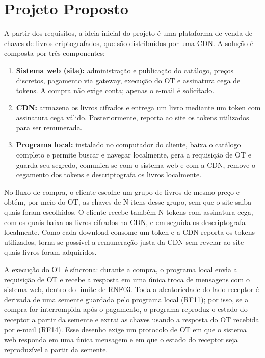 \documentclass[12pt, oneside, a4paper, english, brazil]{abntex2}
\begin{document}
\section{Projeto Proposto}

A partir dos requisitos, a ideia inicial do projeto é uma plataforma de venda
de chaves de livros criptografados, que são distribuídos por uma CDN. A
solução é composta por três componentes:

\begin{enumerate}
\item \textbf{Sistema web (site):} administração e publicação do catálogo,
preços discretos, pagamento via gateway, execução do OT e assinatura cega de
tokens. A compra não exige conta; apenas o e-mail é solicitado.

\item \textbf{CDN:} armazena os livros cifrados e entrega um livro mediante um
token com assinatura cega válido. Posteriormente, reporta ao site os tokens
utilizados para ser remunerada.

\item \textbf{Programa local:} instalado no computador do cliente, baixa o
catálogo completo e permite buscar e navegar localmente, gera a requisição de
OT e guarda seu segredo, comunica-se com o sistema web e com a CDN, remove o
cegamento dos tokens e descriptografa os livros localmente.
\end{enumerate}

No fluxo de compra, o cliente escolhe um grupo de livros de mesmo preço e
obtém, por meio do OT, as chaves de N itens desse grupo, sem que o site saiba
quais foram escolhidos. O cliente recebe também N tokens com assinatura cega,
com os quais baixa os livros cifrados na CDN, e em seguida os descriptografa
localmente. Como cada download consome um token e a CDN reporta os tokens
utilizados, torna-se possível a remuneração justa da CDN sem revelar ao site
quais livros foram adquiridos.

A execução do OT é síncrona: durante a compra, o programa local envia a
requisição de OT e recebe a resposta em uma única troca de mensagens com o
sistema web, dentro do limite de RNF03. Toda a aleatoriedade do lado receptor
é derivada de uma semente guardada pelo programa local (RF11); por isso, se a
compra for interrompida após o pagamento, o programa reproduz o estado do
receptor a partir da semente e extrai as chaves usando a resposta do OT
recebida por e-mail (RF14). Esse desenho exige um protocolo de OT em que o
sistema web responda em uma única mensagem e em que o estado do receptor seja
reproduzível a partir da semente.
\end{document}
